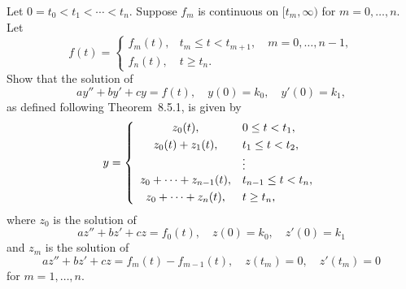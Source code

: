 \begin{exerciselist}
  \item\label{exer:8.5.26} Let $0=t_{0}<t_{1}<\cdots<t_{n}$. Suppose $f_{m}$ is continuous on
        $[t_{m},\infty)$ for $m=0,\dots,n$. Let
  \[
    f(t)= \left\{
    \begin{array}{cl}
      f_{m}(t), & t_{m}\le t<t_{m+1},\quad m=0,\dots,n-1, \\
      f_{n}(t), & t\ge t_{n}.
    \end{array}\right.
  \]
  Show that the solution of
  \[
    ay''+by'+cy=f(t),\quad y(0)=k_{0},\quad y'(0)=k_{1},
  \]
  as defined following Theorem~8.5.1, is given by
  \[
    y=\left\{
    \begin{array}{cl}
      z_{0}(t),                & 0\le t<t_{1},       \\[1\jot]
      z_{0}(t)+z_{1}(t),       & t_{1}\le t<t_{2},   \\
                               & \vdots              \\
      z_{0}+\cdots+z_{n-1}(t), & t_{n-1}\le t<t_{n}, \\[1\jot]
      z_{0}+\cdots+z_{n}(t),   & t\ge t_{n},
    \end{array}\right.
  \]
  where $z_{0}$ is the solution of
  \[
    az''+bz'+cz=f_{0}(t),\quad z(0)=k_{0},\quad z'(0)=k_{1}
  \]
  and $z_{m}$ is the solution of
  \[
    az''+bz'+cz=f_{m}(t)-f_{m-1}(t),\quad z(t_{m})=0,\quad z'(t_{m})=0
  \]
  for $m=1,\dots,n$.
\end{exerciselist}

